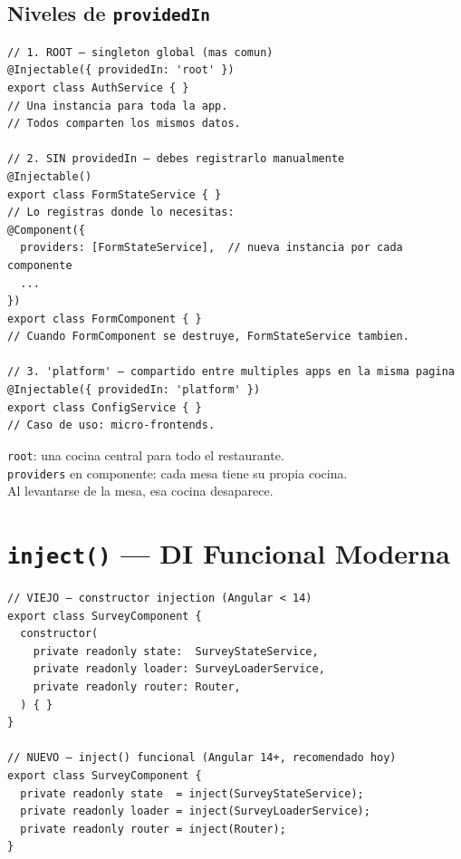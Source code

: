 \documentclass[12pt, a4paper]{article}
\begin{document}
\subsection{ Niveles de \texttt{providedIn}}

\begin{lstlisting}
// 1. ROOT — singleton global (mas comun)
@Injectable({ providedIn: 'root' })
export class AuthService { }
// Una instancia para toda la app.
// Todos comparten los mismos datos.

// 2. SIN providedIn — debes registrarlo manualmente
@Injectable()
export class FormStateService { }
// Lo registras donde lo necesitas:
@Component({
  providers: [FormStateService],  // nueva instancia por cada componente
  ...
})
export class FormComponent { }
// Cuando FormComponent se destruye, FormStateService tambien.

// 3. 'platform' — compartido entre multiples apps en la misma pagina
@Injectable({ providedIn: 'platform' })
export class ConfigService { }
// Caso de uso: micro-frontends.
\end{lstlisting}

\begin{tcolorbox}[analogia, title={\emoji{pizza} \emoji{cook} La Cocina}]
  \texttt{root}: una cocina central para todo el restaurante.\\
  \texttt{providers} en componente: cada mesa tiene su propia cocina.\\
  Al levantarse de la mesa, esa cocina desaparece.
\end{tcolorbox}

\section{  \texttt{inject()} --- DI Funcional Moderna}

\begin{lstlisting}
// VIEJO — constructor injection (Angular < 14)
export class SurveyComponent {
  constructor(
    private readonly state:  SurveyStateService,
    private readonly loader: SurveyLoaderService,
    private readonly router: Router,
  ) { }
}

// NUEVO — inject() funcional (Angular 14+, recomendado hoy)
export class SurveyComponent {
  private readonly state  = inject(SurveyStateService);
  private readonly loader = inject(SurveyLoaderService);
  private readonly router = inject(Router);
}
\end{lstlisting}
\end{document}
